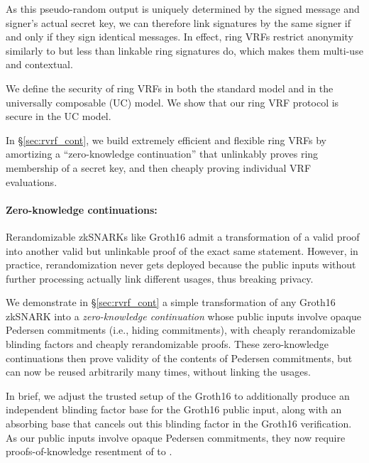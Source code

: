 As this pseudo-random output is uniquely determined by the signed message
and signer's actual secret key, we can therefore link signatures by the
same signer if and only if they sign identical messages.
In effect, ring VRFs restrict anonymity similarly to but less than
linkable ring signatures \cite{ring_linkable,ring_linkablee} do, which makes them multi-use and contextual.

We define the security of ring VRFs in both the standard model
and in the universally composable (UC) \cite{canetti1,canetti2} model. 
We show that our ring VRF protocol is secure in the UC model.

In \S\ref{sec:rvrf_cont}, we build extremely efficient and flexible
ring VRFs by amortizing a ``zero-knowledge continuation'' that unlinkably
proves ring membership of a secret key, and then cheaply proving
individual VRF evaluations.


\paragraph{Zero-knowledge continuations:}

Rerandomizable zkSNARKs like Groth16 \cite{Groth16} admit a
transformation of a valid proof into another valid but unlinkable
proof of the exact same statement.  However, in practice, rerandomization
never gets deployed because the public inputs without further processing actually 
link different usages, thus breaking privacy.

We demonstrate in \S\ref{sec:rvrf_cont} a simple transformation of
any Groth16 zkSNARK into a {\it zero-knowledge continuation} whose
public inputs involve opaque Pedersen commitments (i.e., hiding commitments), with cheaply
rerandomizable blinding factors and cheaply rerandomizable proofs.
These zero-knowledge continuations then prove validity of the contents
of Pedersen commitments, but can now be reused arbitrarily many times,
without linking the usages.

In brief, we adjust the trusted setup of the Groth16 to additionally
produce an independent blinding factor base for the Groth16 public input, 
along with an absorbing base that cancels out this blinding factor in the
Groth16 verification.
As our public inputs involve opaque Pedersen commitments,
they now require proofs-of-knowledge resentment of to \cite{LegoSNARK}. 

